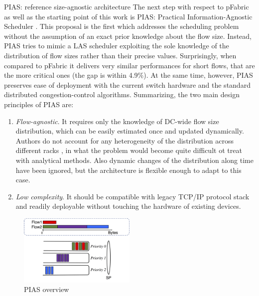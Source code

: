 \begin{subsection}{PIAS: reference size-agnostic architecture}
	\label{sec:pias}
	The next step with respect to pFabric as well as the starting point of this work is PIAS: Practical Information-Agnostic Scheduler \cite{pias}. This proposal is the first which addresses the scheduling problem without the assumption of an exact prior knowledge about the flow size. Instead, PIAS tries to mimic a LAS scheduler exploiting the sole knowledge of the distribution of flow sizes rather than their precise values. Surprisingly, when compared to pFabric it delivers very similar performances for short flows, that are the more critical ones (the gap is within 4.9\%). At the same time, however, PIAS preserves ease of deployment with the current switch hardware and the standard distributed congestion-control algorithms.
	Summarizing, the two main design principles of PIAS are:
	
	\begin{enumerate}
		\item \textit{Flow-agnostic}. It requires only the knowledge of DC-wide flow size distribution, which can be easily estimated once and updated dynamically. Authors do not account for any heterogeneity of the distribution across different racks \cite{facebook_dcn}, in what the problem would become quite difficult ot treat with analytical methods. Also dynamic changes of the distribution along time have been ignored, but the architecture is flexible enough to adapt to this case.
		\item \textit{Low complexity}. It should be compatible with legacy TCP/IP protocol stack and readily deployable without touching the hardware of existing devices.
	\end{enumerate}

	\begin{figure}
		\centering
		\includegraphics[width=0.5\textwidth]{Chapter2/Figures/pias_scheme}
		\caption{PIAS overview}
		\label{fig:pias_scheme}
	\end{figure}


\end{subsection}
